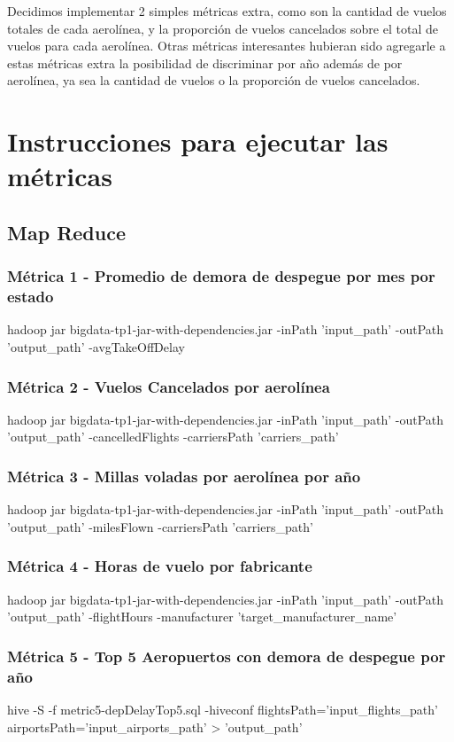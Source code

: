 \documentclass[a4paper,10pt]{article}
\begin{document}
Decidimos implementar 2 simples métricas extra, como son la cantidad de vuelos totales de cada aerolínea, y la proporción de vuelos cancelados sobre el total de vuelos para cada
aerolínea. Otras métricas interesantes hubieran sido agregarle a estas métricas extra la posibilidad de discriminar por año además de por aerolínea, ya sea la cantidad de vuelos
o la proporción de vuelos cancelados.

\section{Instrucciones para ejecutar las métricas}

    \subsection{Map Reduce}
        \subsubsection{Métrica 1 - Promedio de demora de despegue por mes por estado}
            \scriptsize{hadoop jar bigdata-tp1-jar-with-dependencies.jar -inPath 'input\_path' -outPath 'output\_path' -avgTakeOffDelay}
        \subsubsection{Métrica 2 - Vuelos Cancelados por aerolínea}
            \scriptsize{hadoop jar bigdata-tp1-jar-with-dependencies.jar -inPath 'input\_path' -outPath 'output\_path' -cancelledFlights -carriersPath 'carriers\_path'}
        \subsubsection{Métrica 3 - Millas voladas por aerolínea por año}
            \scriptsize{hadoop jar bigdata-tp1-jar-with-dependencies.jar -inPath 'input\_path' -outPath 'output\_path' -milesFlown -carriersPath 'carriers\_path'}
        \subsubsection{Métrica 4 - Horas de vuelo por fabricante}
            \scriptsize{hadoop jar bigdata-tp1-jar-with-dependencies.jar -inPath 'input\_path' -outPath 'output\_path' -flightHours -manufacturer 'target\_manufacturer\_name'}
        \subsubsection{Métrica 5 - Top 5 Aeropuertos con demora de despegue por año}
        \scriptsize{hive -S -f metric5-depDelayTop5.sql -hiveconf flightsPath='input\_flights\_path' airportsPath='input\_airports\_path' > 'output\_path'}
\end{document}
